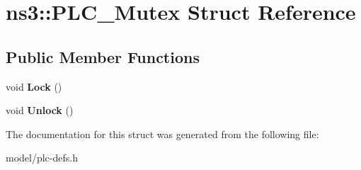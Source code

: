 \hypertarget{structns3_1_1PLC__Mutex}{\section{ns3\-:\-:\-P\-L\-C\-\_\-\-Mutex \-Struct \-Reference}
\label{structns3_1_1PLC__Mutex}
}
\subsection*{\-Public \-Member \-Functions}
\begin{DoxyCompactItemize}
\item 
\hypertarget{structns3_1_1PLC__Mutex_a2eadabbe932b62f2bac324316155f8de}{void {\bfseries \-Lock} ()}\label{structns3_1_1PLC__Mutex_a2eadabbe932b62f2bac324316155f8de}

\item 
\hypertarget{structns3_1_1PLC__Mutex_a363ac7621b809db5e18a8e45adddcf47}{void {\bfseries \-Unlock} ()}\label{structns3_1_1PLC__Mutex_a363ac7621b809db5e18a8e45adddcf47}

\end{DoxyCompactItemize}


\-The documentation for this struct was generated from the following file\-:\begin{DoxyCompactItemize}
\item 
model/plc-\/defs.\-h\end{DoxyCompactItemize}
